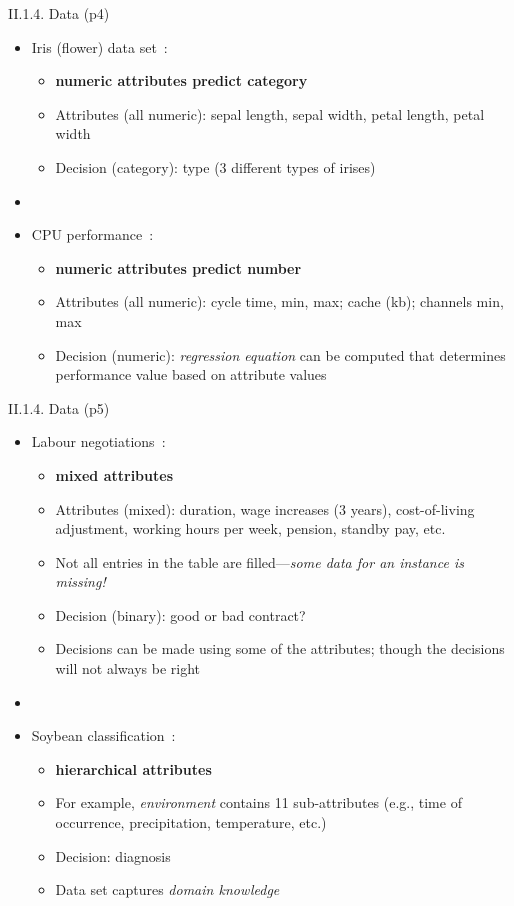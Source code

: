 \documentclass[handout]{beamer}
\newcommand{\stronger}[1]{\textbf{\color{purple} #1}}
\begin{document}
\begin{frame}{II.1.4. Data (p4)}
\begin{itemize}
%
\item Iris (flower) data set~\cite{WFH3:2011}:
	\begin{itemize}
 	\item \stronger{numeric attributes predict category}
	\item Attributes (all numeric): sepal length, sepal width, petal length, petal width
	\item Decision (category): type (3 different types of irises)
	\end{itemize}
\item[]
\item CPU performance~\cite{WFH3:2011}:
	\begin{itemize}
	\item \stronger{numeric attributes predict number}
	\item Attributes (all numeric): cycle time, min, max; cache (kb); channels min, max
	\item Decision (numeric): \emph{regression equation} can be computed that determines performance value based on attribute values
	\end{itemize}
%
\end{itemize}
\end{frame}
\begin{frame}{II.1.4. Data (p5)}
\begin{itemize}
\item Labour negotiations~\cite{WFH3:2011}:
	\begin{itemize}
	\item \stronger{mixed attributes}
	\item Attributes (mixed): duration, wage increases (3 years), cost-of-living adjustment, working hours per week, pension, standby pay, etc.
	\item Not all entries in the table are filled---\emph{some data for an instance is missing!}
	\item Decision (binary): good or bad contract?
	\item Decisions can be made using some of the attributes; though the decisions will not always be right
	\end{itemize}
\item[]
\item Soybean classification~\cite{WFH3:2011}:
	\begin{itemize}
	\item \stronger{hierarchical attributes}
	\item For example, \emph{environment} contains 11 sub-attributes (e.g., time of occurrence, precipitation, temperature, etc.)
	\item Decision: diagnosis
	\item Data set captures \emph{domain knowledge}
	\end{itemize}
\end{itemize}
\end{frame}
\end{document}
